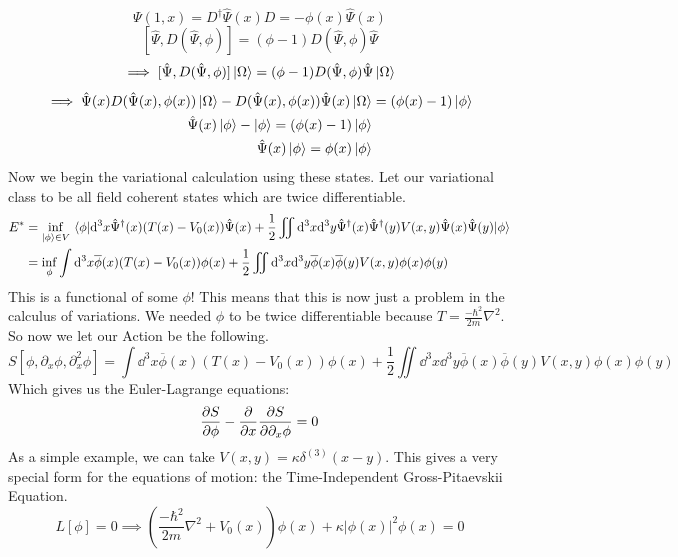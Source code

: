 \documentclass{article}
\begin{document}
\begin{equation}
\Psi(1,x)=D^\dagger \hat\Psi(x) D = -\phi(x)\hat\Psi(x)
\end{equation}
\[[\hat\Psi,D(\hat\Psi,\phi)] = (\phi-1)D(\hat\Psi,\phi)\hat\Psi\]
\[\implies [\hat\Psi,D(\hat\Psi,\phi)]\ket{\Omega} = (\phi-1)D(\hat\Psi,\phi)\hat\Psi\ket{\Omega}\]
\begin{align}
\implies \hat\Psi(x) D(\hat\Psi(x),\phi(x))\ket{\Omega} - D(\hat\Psi(x),\phi(x))\hat\Psi(x)\ket{\Omega} &= (\phi(x)-1)\ket{\phi}\\
\hat\Psi(x)\ket{\phi}-\ket{\phi}=(\phi(x)-1)\ket{\phi}\\
\hat\Psi(x)\ket{\phi}=\phi(x)\ket{\phi}
\end{align}
Now we begin the variational calculation using these states. Let our variational class to be all field coherent states which are twice differentiable.
\begin{align}
E^* &= \inf_{\ket{\phi}\in V} \expval{\dd^3 x \hat\Psi^\dagger(x)(T(x)-V_0(x))\hat\Psi(x) + \frac{1}{2}\iint\dd^3 x \dd^3 y \hat\Psi^\dagger(x)\hat\Psi^\dagger(y)V(x,y)\hat\Psi(x)\hat\Psi(y)}{\phi}\\
&= \inf_{\phi}\int \dd^3 x\overline\phi(x) (T(x)-V_0(x))\phi(x)+\frac{1}{2} \iint \dd^3 x \dd^3 y \overline\phi(x)\overline\phi(y)V(x,y)\phi(x)\phi(y)
\end{align}
This is a functional of some $\phi$! This means that this is now just a problem in the calculus of variations. We needed $\phi$ to be twice differentiable because $T = \frac{-\hbar^2}{2m}\nabla^2$. So now we let our Action be the following.
\[S[\phi,\partial_x \phi, \partial_x^2 \phi] =\int \dd^3 x\overline\phi(x) (T(x)-V_0(x))\phi(x)+\frac{1}{2} \iint \dd^3 x \dd^3 y \overline\phi(x)\overline\phi(y)V(x,y)\phi(x)\phi(y)\]
Which gives us the Euler-Lagrange equations:
\begin{equation}
\pdv{S}{\phi}-\pdv{x}\pdv{S}{\partial_x\phi} = 0
\end{equation}
As a simple example, we can take $V(x,y) = \kappa \delta^{(3)}(x-y)$. This gives a very special form for the equations of motion: the Time-Independent Gross-Pitaevskii Equation.
\begin{equation}
L[\phi]=0\implies \left(\frac{-\hbar^2}{2m}\nabla^2 + V_0(x)\right)\phi(x) + \kappa|\phi(x)|^2 \phi(x)=0
\end{equation}

\printbibliography
\end{document}
